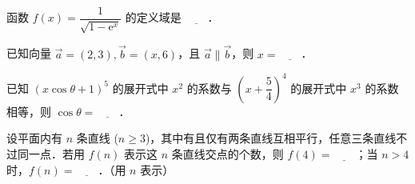 \begin{question}
函数 $f(x) = \dfrac{1}{\sqrt{1 - \mathrm{e}^x}}$ 的定义域是 $\underline{\qquad}$．

\end{question}
\begin{question}
已知向量 $\vec{a} = (2, 3), \vec{b} = (x, 6)$，且 $\vec{a} \parallel \vec{b}$，则 $x = \underline{\qquad}$．

\end{question}
\begin{question}
已知 $(x\cos\theta + 1)^5$ 的展开式中 $x^2$ 的系数与 $\left(x + \dfrac{5}{4}\right)^4$ 的展开式中 $x^3$ 的系数相等，则 $\cos\theta = \underline{\qquad}$．

\end{question}
\begin{question}
设平面内有 $n$ 条直线 ($n \geqslant 3$)，其中有且仅有两条直线互相平行，任意三条直线不过同一点．若用 $f(n)$ 表示这 $n$ 条直线交点的个数，则 $f(4) = \underline{\qquad}$；当 $n > 4$ 时，$f(n) = \underline{\qquad}$．（用 $n$ 表示）

\end{question}

